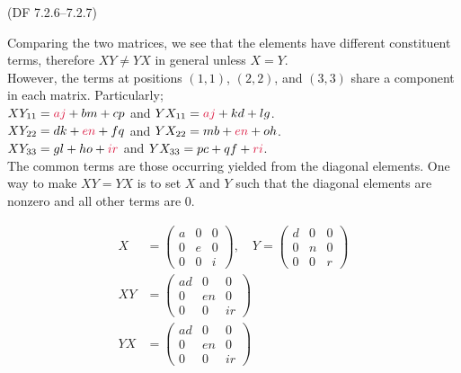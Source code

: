 \begin{problem}{(\textsf{DF 7.2.6--7.2.7})}
\begin{enumalph}
\begin{Answer}
        Comparing the two matrices, we see that the elements have different constituent terms,
        therefore $XY \neq YX$ in general unless $X = Y$. \\
        However, the terms at positions $(1, 1)$, $(2, 2)$, and $(3, 3)$ share a component in
        each matrix. Particularly;  \\
        \centering
        $XY_{11} = \crim{aj} + bm + cp$ and $YX_{11} = \crim{aj} + kd + {l}g$. \\
        $XY_{22} = dk + \crim{en} + fq$ and $YX_{22} = mb + \crim{en} + oh$. \\
        $XY_{33} = gl + ho + \crim{ir}$ and $YX_{33} = pc + qf + \crim{ri}$. \\
        \flushleft
        The common terms are those occurring yielded from the diagonal elements.
        One way to make $XY = YX$ is to set $X$ and $Y$ such that the diagonal elements
        are nonzero and all other terms are $0$.

        \begin{align*}
          X &= \begin{pmatrix} a & 0 & 0 \\ 0 & e & 0 \\ 0 & 0 & i \end{pmatrix}, \quad
          Y = \begin{pmatrix} d & 0 & 0 \\ 0 & n & 0 \\ 0 & 0 & r \end{pmatrix} \\
          XY &= \begin{pmatrix} ad & 0 & 0 \\ 0 & en & 0 \\ 0 & 0 & ir \end{pmatrix} \\
          YX &= \begin{pmatrix} ad & 0 & 0 \\ 0 & en & 0 \\ 0 & 0 & ir \end{pmatrix} \\
        \end{align*}


\end{Answer}
\end{enumalph}
\end{problem}
